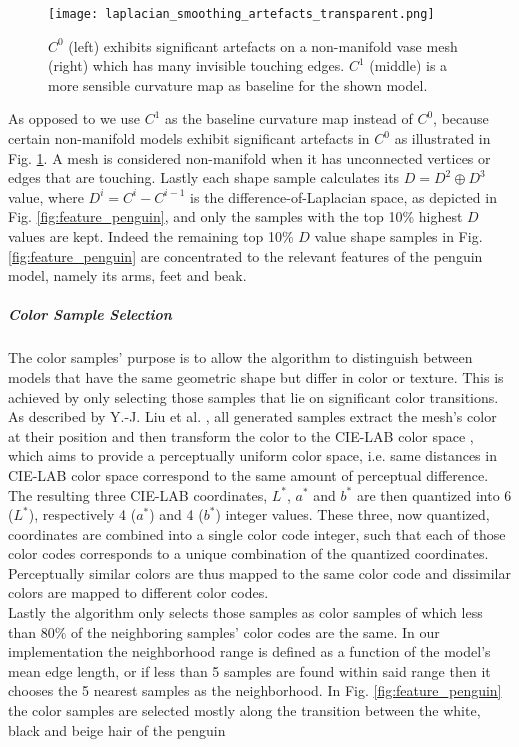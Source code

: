 \begin{figure}
\centering
\captionsetup{width=0.8\textwidth}
\texttt{[image: laplacian\_smoothing\_artefacts\_transparent.png]}
\caption{$C^0$ (left) exhibits significant artefacts on a non-manifold vase mesh (right) which has many invisible touching edges. $C^1$ (middle) is a more sensible curvature map as baseline for the shown model.}
\label{fig:laplacian_smoothing_artefacts}
\end{figure}

As opposed to \cite{cluster_d2_color} we use
$C^1$ as the baseline curvature map instead of $C^0$, because certain non-manifold models exhibit significant artefacts in $C^0$ as illustrated in Fig. \ref{fig:laplacian_smoothing_artefacts}. A mesh is considered non-manifold when it has unconnected vertices or edges that are touching. Lastly each shape sample calculates its $D = D^2 \oplus D^3$ value, where $D^i = C^i - C^{i-1}$ is the difference-of-Laplacian space, as depicted in Fig. \ref{fig:feature_penguin}, and only the samples with the top 10\% highest $D$ values are kept. Indeed the remaining top
10\% $D$ value shape samples in Fig. \ref{fig:feature_penguin} are concentrated to the relevant features of the penguin model, namely its arms, feet and beak.

\subparagraph{Color Sample Selection}

The color samples' purpose is to allow the algorithm to distinguish between models that have the same geometric shape but differ in
color or texture. This is achieved by only selecting those samples that lie on significant color transitions. As described by
Y.-J. Liu et al. \cite{cluster_d2_color}, all generated samples extract the mesh's color at their position and then transform
the color to the CIE-LAB color space \cite{cie_color_space}, which aims to provide a perceptually uniform color space, i.e. same distances in CIE-LAB color space correspond to the same amount of perceptual difference.
The resulting three CIE-LAB coordinates, $L^*$, $a^*$ and $b^*$ are then quantized into 6 ($L^*$), respectively 4 ($a^*$) and 4 ($b^*$) integer values. These three, now quantized, coordinates are combined into a single color code integer, such that each of those color codes corresponds to a unique combination of the quantized coordinates. Perceptually similar colors are thus mapped to the same color code and dissimilar colors are mapped to different color codes.\\
Lastly the algorithm only selects those samples as color samples of which less than $80\%$ of the neighboring samples' color codes are the same. In our implementation the neighborhood range is defined as a function of the model's mean edge length, or if less than 5 samples are found within said range then it chooses the 5 nearest samples as the neighborhood. In Fig. \ref{fig:feature_penguin} the
color samples are selected mostly along the transition between the white, black and beige hair of the penguin

